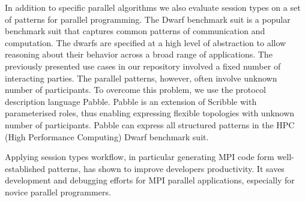 In addition to specific parallel algorithms we also evaluate session types on a set of patterns for parallel programming. 
The Dwarf benchmark suit is a popular benchmark suit that captures common patterns of communication and computation. %
The dwarfs are specified at a high level of abstraction to allow reasoning about their behavior across a broad range of applications.
The previously presented use cases in our repository involved a fixed number of interacting parties. The parallel patterns, however, often involve unknown number of participants. To overcome this problem, we use the protocol description language Pabble. 
Pabble is an extension of Scribble with parameterised roles, thus enabling expressing flexible topologies with unknown number of participants.  Pabble can express all structured patterns in the HPC (High Performance Computing) Dwarf benchmark suit. 

Applying session types workflow, in particular generating MPI code form well-established patterns, has shown to improve developers productivity. It saves development and debugging efforts for MPI parallel applications, especially for novice parallel programmers.


